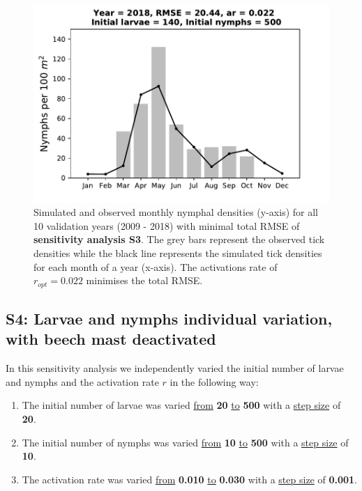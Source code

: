 \documentclass[a4paper, 11pt]{scrartcl}
\begin{document}
\begin{figure}[h!]
\begin{minipage}[c]{0.40\linewidth}
\end{minipage}
\begin{minipage}[c]{0.40\linewidth}
\includegraphics[width=\linewidth]{figures/s3/S3_2018}
\end{minipage}
\caption{Simulated and observed monthly nymphal densities (y-axis) for all 10 validation years (2009 - 2018) with minimal total RMSE of \textbf{sensitivity analysis S3}. The grey bars represent the observed tick densities while the black line represents the simulated tick densities for each month of a year (x-axis). The activations rate of $r_{opt}= 0.022$ minimises the total RMSE.}
\label{fig:independent_initial_ticks_with_beech}
\end{figure}


\newpage
\subsection{S4: Larvae and nymphs individual variation, with beech mast deactivated}
In this sensitivity analysis we independently varied the initial number of larvae and nymphs and the activation rate $r$ in the following way:

\begin{enumerate}
\item The initial number of larvae was varied \underline{from} \textbf{20} \underline{to} \textbf{500} with a \underline{step size} of \textbf{20}.
\item The initial number of nymphs was varied \underline{from} \textbf{10} \underline{to} \textbf{500} with a \underline{step size} of \textbf{10}.
\item The activation rate was varied \underline{from} \textbf{0.010} \underline{to} \textbf{0.030} with a \underline{step size} of \textbf{0.001}.
\end{enumerate}
\end{document}
